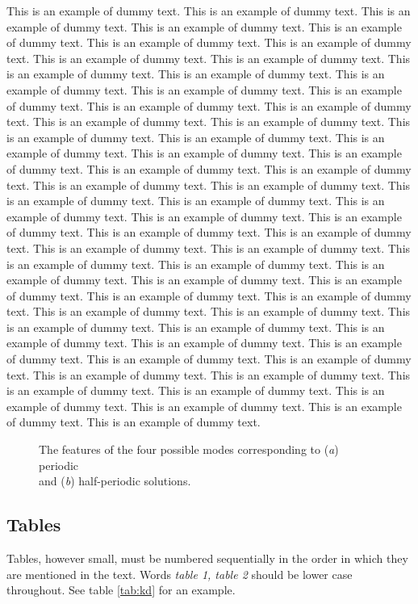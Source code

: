 \documentclass[lineno]{jfm}
\begin{document}
 This is an example of dummy text. This is an example of dummy text. This is an example of dummy text. This is an example of dummy text. This is an example of dummy text. This is an example of dummy text. This is an example of dummy text. This is an example of dummy text. This is an example of dummy text. This is an example of dummy text. This is an example of dummy text. This is an example of dummy text. This is an example of dummy text. This is an example of dummy text. This is an example of dummy text. This is an example of dummy text. This is an example of dummy text. This is an example of dummy text. This is an example of dummy text. This is an example of dummy text. This is an example of dummy text. This is an example of dummy text. This is an example of dummy text. This is an example of dummy text. This is an example of dummy text. This is an example of dummy text. This is an example of dummy text. This is an example of dummy text. This is an example of dummy text. This is an example of dummy text. This is an example of dummy text. This is an example of dummy text. This is an example of dummy text. This is an example of dummy text. This is an example of dummy text. This is an example of dummy text. This is an example of dummy text. This is an example of dummy text. This is an example of dummy text. This is an example of dummy text. This is an example of dummy text. This is an example of dummy text. This is an example of dummy text. This is an example of dummy text. This is an example of dummy text. This is an example of dummy text. This is an example of dummy text. This is an example of dummy text. This is an example of dummy text. This is an example of dummy text. This is an example of dummy text. This is an example of dummy text. This is an example of dummy text. This is an example of dummy text. This is an example of dummy text. This is an example of dummy text. This is an example of dummy text. This is an example of dummy text. This is an example of dummy text. This is an example of dummy text.

\begin{figure}
  \caption{The features of the four possible modes corresponding to
  (\textit{a}) periodic\protect\\ and (\textit{b}) half-periodic solutions.}
\label{fig:kd}
\end{figure}

\subsection{Tables}
 Tables, however small, must be numbered sequentially in the order in which they are mentioned in the text. Words \textit {table 1, table 2} should be lower case throughout.
 See table \ref{tab:kd} for an example.
\end{document}
